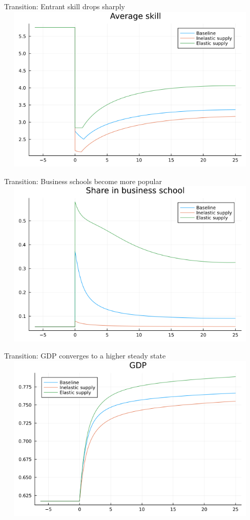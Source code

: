 \documentclass[
  ignorenonframetext,
  aspectratio=1610,
]{beamer}
\begin{document}
\begin{frame}{Transition: Entrant skill drops sharply}
\protect\hypertarget{transition-entrant-skill-drops-sharply}{}
\includegraphics[width=13cm,height=8cm]{fig/model-skill-liberalization.png}
\end{frame}

\begin{frame}{Transition: Business schools become more popular}
\protect\hypertarget{transition-business-schools-become-more-popular}{}
\includegraphics[width=13cm,height=8cm]{fig/model-econ-liberalization.png}
\end{frame}

\begin{frame}{Transition: GDP converges to a higher steady state}
\protect\hypertarget{transition-gdp-converges-to-a-higher-steady-state}{}
\includegraphics[width=13cm,height=8cm]{fig/model-gdp-liberalization.png}
\end{frame}
\end{document}
